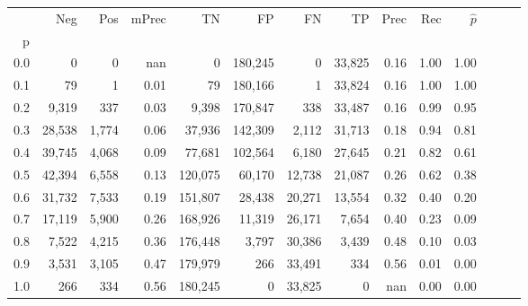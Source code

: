 \begin{tabular}{rrrrrrrrrrrrrr}
\toprule
{} &     Neg &    Pos & mPrec &       TN &       FP &      FN &      TP &  Prec &   Rec & $\hat{p}$ \\
p   &         &        &       &          &          &         &         &       &       &           \\
\midrule
0.0 &       0 &      0 &   nan &        0 &  180,245 &       0 &  33,825 &  0.16 &  1.00 &      1.00 \\
0.1 &      79 &      1 &  0.01 &       79 &  180,166 &       1 &  33,824 &  0.16 &  1.00 &      1.00 \\
0.2 &   9,319 &    337 &  0.03 &    9,398 &  170,847 &     338 &  33,487 &  0.16 &  0.99 &      0.95 \\
0.3 &  28,538 &  1,774 &  0.06 &   37,936 &  142,309 &   2,112 &  31,713 &  0.18 &  0.94 &      0.81 \\
0.4 &  39,745 &  4,068 &  0.09 &   77,681 &  102,564 &   6,180 &  27,645 &  0.21 &  0.82 &      0.61 \\
0.5 &  42,394 &  6,558 &  0.13 &  120,075 &   60,170 &  12,738 &  21,087 &  0.26 &  0.62 &      0.38 \\
0.6 &  31,732 &  7,533 &  0.19 &  151,807 &   28,438 &  20,271 &  13,554 &  0.32 &  0.40 &      0.20 \\
0.7 &  17,119 &  5,900 &  0.26 &  168,926 &   11,319 &  26,171 &   7,654 &  0.40 &  0.23 &      0.09 \\
0.8 &   7,522 &  4,215 &  0.36 &  176,448 &    3,797 &  30,386 &   3,439 &  0.48 &  0.10 &      0.03 \\
0.9 &   3,531 &  3,105 &  0.47 &  179,979 &      266 &  33,491 &     334 &  0.56 &  0.01 &      0.00 \\
1.0 &     266 &    334 &  0.56 &  180,245 &        0 &  33,825 &       0 &   nan &  0.00 &      0.00 \\
\bottomrule
\end{tabular}
